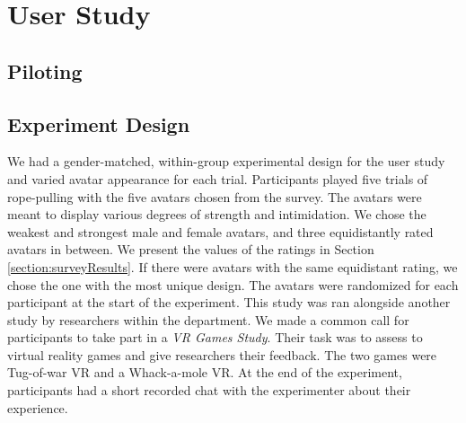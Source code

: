 
\section{User Study}
\subsection{Piloting}


\subsection{Experiment Design}
We had a gender-matched, within-group experimental design for the user study and varied avatar appearance for each trial. Participants played five trials of rope-pulling with the five avatars chosen from the survey. The avatars were meant to display various degrees of strength and intimidation. We chose the weakest and strongest male and female avatars, and three equidistantly rated avatars in between. We present the values of the ratings in Section \ref{section:surveyResults}. If there were avatars with the same equidistant rating, we chose the one with the most unique design.  The avatars were randomized for each participant at the start of the experiment. This study was ran alongside another study by researchers within the department. We made a common call for participants to take part in a \textit{VR Games Study}. Their task was to assess to virtual reality games and give researchers their feedback. The two games were Tug-of-war VR and a Whack-a-mole VR. At the end of the experiment, participants had a short recorded chat with the experimenter about their experience.

